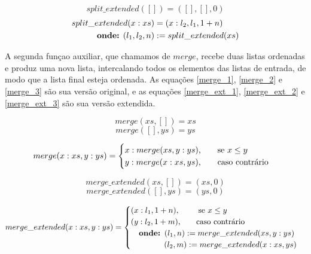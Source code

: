 \documentclass[12pt, oneside, a4paper,english,brazil]{abntex2}
\begin{document}
\newpage

\begin{equation}\label{split_ext_base}
  split\_extended([]) = ([], [], 0)
\end{equation}
\begin{equation}\label{split_ext_ind}
\begin{split}
  split\_extended(x : xs) &= (x : l_{2}, l_{1}, 1 + n)\\
  \text{\textbf{onde:} } (l_{1}, l_{2}, n) &:= split\_extended(xs)
\end{split}
\end{equation}


\qquad A segunda fun\c{c}ao auxiliar, que chamamos de $merge$, recebe duas listas
ordenadas e produz uma nova lista, intercalando todos os elementos das listas
de entrada, de modo que a lista final esteja ordenada. As equa\c{c}\~oes \ref{merge_1},
\ref{merge_2} e \ref{merge_3} s\~ao sua vers\~ao original, e as equa\c{c}\~oes
\ref{merge_ext_1}, \ref{merge_ext_2} e \ref{merge_ext_3} s\~ao sua vers\~ao extendida.

\begin{equation} \label{merge_1}
merge(xs, []) = xs
\end{equation}
\begin{equation} \label{merge_2}
merge([], ys) = ys
\end{equation}

\begin{equation} \label{merge_3}
merge(x : xs, y : ys) =
     \begin{cases}
       x : merge(xs, y : ys) \text{,\qquad se $x \le y$} \\
       y : merge(x : xs, ys) \text{,\qquad caso contr\'ario}
     \end{cases}
\end{equation}

\begin{equation} \label{merge_ext_1}
merge\_extended(xs, []) = (xs, 0)
\end{equation}
\begin{equation} \label{merge_ext_2}
merge\_extended([], ys) = (ys, 0)
\end{equation}

\begin{equation} \label{merge_ext_3}
merge\_extended(x : xs, y : ys) =
     \begin{cases}
       (x : l_{1}, 1 + n) \text{,\qquad \, se $x \le y$} \\
       (y : l_{2}, 1 + m) \text{,\qquad caso contr\'ario} \\
       \text{\quad \textbf{onde: }} (l_{1}, n) := merge\_extended(xs, y : ys) \\
       \text{\qquad \quad \,\,\,\,\, } (l_{2}, m) := merge\_extended(x : xs, ys)
     \end{cases}
\end{equation}
\end{document}
